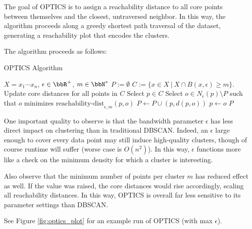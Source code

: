 The goal of OPTICS is to assign a reachability distance to all core points between themselves and the closest, untraversed neighbor. In this way, the algorithm proceeds along a greedy shortest path traversal of the dataset, generating a reachability plot that encodes the clusters.

The algorithm proceeds as follows:

  \begin{algorithm}[H]
    \caption{OPTICS Algorithm}
    \label{dbscan++ alg}
    \begin{algorithmic}[1]
      \renewcommand\algorithmicrequire{\textbf{input}}
      \REQUIRE $X = {x_1\cdots x_n}$, $\epsilon \in \bbR^+$, $m \in \bbN^*$
      \STATE $P := \emptyset$
      \STATE $C:=\{x \in X \ | \ X \cap B(x, \epsilon) \geq m\}$.
      \STATE Update core distances for all points in $C$
      \STATE Select $p \in C$
       \STATE Select $o \in N_\epsilon (p) \setminus P$ such that $o$ minimizes $\text{reachability-dist}_{\epsilon, m}(p, o)$
       \STATE $P \leftarrow P \cup (p, d(p, o))$
       \STATE $p \leftarrow o$
      \ENDWHILE
      \RETURN $P$
    \end{algorithmic}
  \end{algorithm}

One important quality to observe is that the bandwidth parameter $\epsilon$ has less direct impact on clustering than in traditional DBSCAN. Indeed, an $\epsilon$ large enough to cover every data point may still induce high-quality clusters, though of course runtime will suffer (worse case is $O(n^2)$). In this way, $\epsilon$ functions more like a check on the minimum density for which a cluster is interesting.

Also observe that the minimum number of points per cluster $m$ has reduced effect as well. If the value was raised, the core distances would rise accordingly, scaling all reachability distances. In this way, OPTICS is overall far less sensitive to its parameter settings than DBSCAN.  

See Figure \ref{fig:optics_plot} for an example run of OPTICS (with max $\epsilon$).

